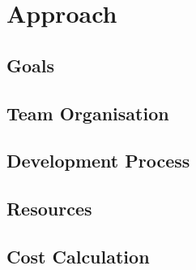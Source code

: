 \chapter{Approach}

\section{Goals}

\section{Team Organisation}

\section{Development Process}

\section{Resources}

\section{Cost Calculation}


